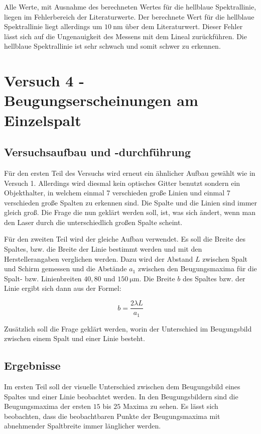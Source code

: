        Alle Werte, mit Ausnahme des berechneten Wertes für die hellblaue Spektrallinie, liegen im Fehlerbereich der Literaturwerte. Der berechnete Wert für die hellblaue Spektrallinie liegt allerdings um $10\ \mathrm{nm}$ über dem Literaturwert. Dieser Fehler lässt sich auf die Ungenauigkeit des Messens mit dem Lineal zurückführen. Die hellblaue Spektrallinie ist sehr schwach und somit schwer zu erkennen.

\section{Versuch 4 - Beugungserscheinungen am Einzelspalt}

    \subsection{Versuchsaufbau und -durchführung}

        Für den ersten Teil des Versuchs wird erneut ein ähnlicher Aufbau gewählt wie in Versuch 1. Allerdings wird diesmal kein optisches Gitter benutzt sondern ein Objekthalter, in welchem einmal 7 verschieden große Linien und einmal 7 verschieden große Spalten zu erkennen sind. Die Spalte und die Linien sind immer gleich groß. Die Frage die nun geklärt werden soll, ist, was sich ändert, wenn man den Laser durch die unterschiedlich großen Spalte scheint.

        Für den zweiten Teil wird der gleiche Aufbau verwendet. Es soll die Breite des Spaltes, bzw. die Breite der Linie bestimmt werden und mit den Herstellerangaben verglichen werden. Dazu wird der Abstand $L$ zwischen Spalt und Schirm gemessen und die Abstände $a_{1}$ zwischen den Beugungsmaxima für die Spalt- bzw. Linienbreiten $40, 80$ und $150\ \mathrm{\mu m}$. Die Breite $b$ des Spaltes bzw. der Linie ergibt sich dann aus der Formel:

        \begin{equation}
            b = \frac{2 \lambda L}{a_{1}}
        \end{equation}

        Zusätzlich soll die Frage geklärt werden, worin der Unterschied im Beugungsbild zwischen einem Spalt und einer Linie besteht.
    
    \subsection{Ergebnisse}

        Im ersten Teil soll der visuelle Unterschied zwischen dem Beugungsbild eines Spaltes und einer Linie beobachtet werden. In den Beugungsbildern sind die Beugungsmaxima der ersten $15$ bis $25$ Maxima zu sehen. Es lässt sich beobachten, dass die beobachtbaren Punkte der Beugungsmaxima mit abnehmender Spaltbreite immer länglicher werden. 

